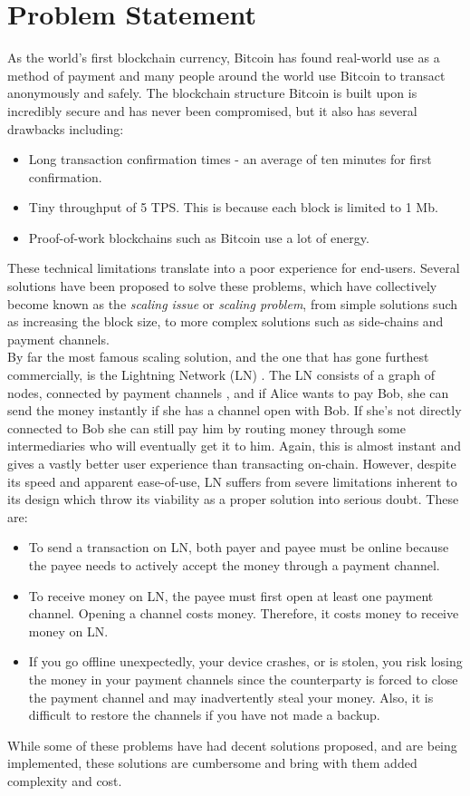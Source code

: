 \documentclass{report}
\begin{document}
	\section{Problem Statement}
		As the world’s first blockchain currency, Bitcoin has found real-world use as a method of payment and many people around the world use Bitcoin to transact anonymously and safely. The blockchain structure Bitcoin is built upon is incredibly secure and has never been compromised, but it also has several drawbacks including:
		\begin{itemize}
			\item Long transaction confirmation times - an average of ten minutes for first confirmation.
			\item Tiny throughput of 5 TPS. This is because each block is limited to 1 Mb. 
			\item Proof-of-work blockchains such as Bitcoin use a lot of energy. 
		\end{itemize}
		These technical limitations translate into a poor experience for end-users. Several solutions have been proposed to solve these problems, which have collectively become known as the \textit{scaling issue} or \textit{scaling problem}, from simple solutions such as increasing the block size, to more complex solutions such as side-chains and payment channels. \\
		
		By far the most famous scaling solution, and the one that has gone furthest commercially, is the Lightning Network (LN) \cite{ln}.  The LN consists of a graph of nodes, connected by payment channels , and if Alice wants to pay Bob, she can send the money instantly if she has a channel open with Bob. If she's not directly connected to Bob she can still pay him by routing money through some intermediaries who will eventually get it to him. Again, this is almost instant and gives a vastly better user experience than transacting on-chain. However, despite its speed and apparent ease-of-use, LN suffers from severe limitations inherent to its design which throw its viability as a proper solution into serious doubt. These are: 
		\begin{itemize}
			\item To send a transaction on LN, both payer and payee must be online because the payee needs to actively accept the money through a payment channel. 
			\item To receive money on LN, the payee must first open at least one payment channel. Opening a channel costs money. Therefore, it costs money to receive money on LN. 
			\item If you go offline unexpectedly, your device crashes, or is stolen, you risk losing the money in your payment channels since the counterparty is forced to close the payment channel and may inadvertently steal your money. Also, it is difficult to restore the channels if you have not made a backup. 
		\end{itemize}
		While some of these problems have had decent solutions proposed, and are being implemented, these solutions are cumbersome and bring with them added complexity and cost. \\
		
\end{document}
